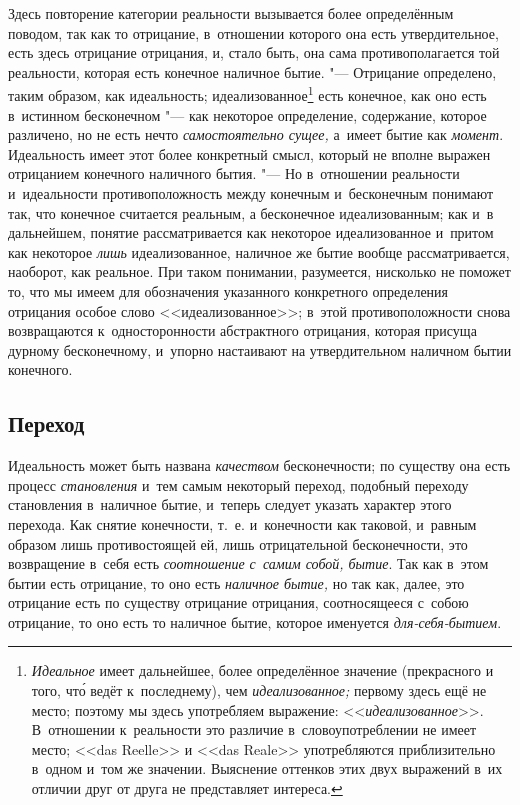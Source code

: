 Здесь повторение категории реальности вызывается более определённым поводом,
так как то отрицание, в~отношении которого она есть утвердительное, есть
здесь отрицание отрицания, и, стало быть, она сама противополагается той
реальности, которая есть конечное наличное бытие. "--- Отрицание определено,
таким образом, как идеальность; идеализованное\footnote{{\em Идеальное}
имеет дальнейшее, более определённое значение (прекрасного и
того, чт\'{о} ведёт к~последнему), чем {\em идеализованное;} первому здесь ещё
не место; поэтому мы здесь употребляем выражение: <<{\em идеализованное}>>.
В~отношении к~реальности это различие в~словоупотреблении не имеет место;
<<das Reelle>> и <<das Reale>> употребляются приблизительно в~одном и~том же
значении. Выяснение оттенков этих двух выражений в~их отличии друг от друга
не представляет интереса.} есть конечное, как оно есть в~истинном
бесконечном "--- как некоторое определение, содержание, которое различено, но
не есть нечто {\em самостоятельно сущее,} а~имеет бытие
как {\em момент}. Идеальность имеет этот более
конкретный смысл, который не вполне выражен отрицанием конечного наличного
бытия. "--- Но в~отношении реальности и~идеальности противоположность между
конечным и~бесконечным понимают так, что конечное считается реальным, а
бесконечное идеализованным; как и~в дальнейшем, понятие рассматривается как
некоторое идеализованное и~притом как некоторое
{\em лишь} идеализованное, наличное же бытие вообще
рассматривается, наоборот, как реальное. При таком понимании, разумеется,
нисколько не поможет то, что мы имеем для обозначения указанного
конкретного определения отрицания особое слово <<идеализованное>>; в~этой
противоположности снова возвращаются к~односторонности абстрактного
отрицания, которая присуща дурному бесконечному, и~упорно настаивают на
утвердительном наличном бытии конечного.

\subsection[Переход]{Переход}

Идеальность может быть названа {\em качеством}
бесконечности; по существу она есть процесс
{\em становления} и~тем самым некоторый переход,
подобный переходу становления в~наличное бытие, и~теперь следует указать
характер этого перехода. Как снятие конечности, т.~е. и~конечности как
таковой, и~равным образом лишь противостоящей ей, лишь отрицательной
бесконечности, это возвращение в~себя есть
{\em соотношение с~самим собой, бытие}. Так как в~этом бытии есть отрицание, то
оно есть {\em наличное бытие,} но так как, далее, это отрицание есть
по существу отрицание отрицания, соотносящееся с~собою отрицание, то
оно есть то наличное бытие, которое именуется {\em для-себя-бытием}.

